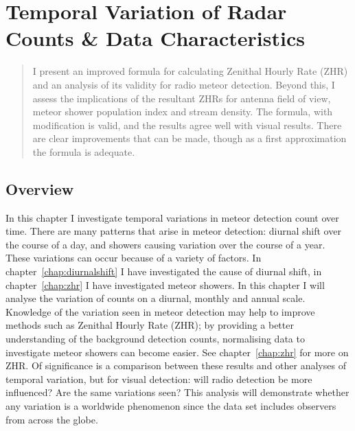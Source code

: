 \chapter{Temporal Variation of Radar Counts \& Data Characteristics}
\label{chap:temporal}
\begin{strip}
	\begin{minipage}{\textwidth}
		\begin{abstract}
			I present an improved formula for calculating Zenithal Hourly Rate (ZHR) and an analysis of its validity for radio meteor detection. Beyond this, I assess the implications of the resultant ZHRs for antenna field of view, meteor shower population index and stream density. The formula, with modification is valid, and the results agree well with visual results. There are clear improvements that can be made, though as a first approximation the formula is adequate.
		\end{abstract}
	\end{minipage}
\end{strip}
\section{Overview}
In this chapter I investigate temporal variations in meteor detection count over time. There are many patterns that arise in meteor detection: diurnal shift over the course of a day, and showers causing variation over the course of a year. These variations can occur because of a variety of factors. In chapter~\ref{chap:diurnalshift} I have investigated the cause of diurnal shift, in chapter~\ref{chap:zhr} I have investigated meteor showers. In this chapter I will analyse the variation of counts on a diurnal, monthly and annual scale.\\
Knowledge of the variation seen in meteor detection may help to improve methods such as Zenithal Hourly Rate (ZHR); by providing a better understanding of the background detection counts, normalising data to investigate meteor showers can become easier. See chapter~\ref{chap:zhr} for more on ZHR. Of significance is a comparison between these results and other analyses of temporal variation, but for visual detection: will radio detection be more influenced? Are the same variations seen? This analysis will demonstrate whether any variation is a worldwide phenomenon since the data set includes observers from across the globe.
